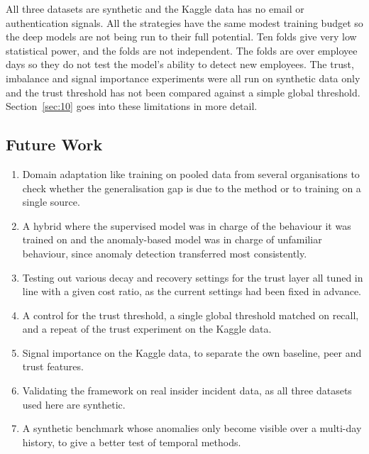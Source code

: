 \documentclass[a4paper,12pt]{article}
\begin{document}
All three datasets are synthetic and the Kaggle data has no email or authentication signals. All the strategies have the same modest training budget so the deep models are not being run to their full potential. Ten folds give very low statistical power, and the folds are not independent. The folds are over employee days so they do not test the model's ability to detect new employees. The trust, imbalance and signal importance experiments were all run on synthetic data only and the trust threshold has not been compared against a simple global threshold. Section~\ref{sec:10} goes into these limitations in more detail.

\subsection{Future Work}
\label{sec:11.3}

\begin{enumerate}
  \item Domain adaptation like training on pooled data from several organisations to check whether the generalisation gap is due to the method or to training on a single source.
  \item A hybrid where the supervised model was in charge of the behaviour it was trained on and the anomaly-based model was in charge of unfamiliar behaviour, since anomaly detection transferred most consistently.
  \item Testing out various decay and recovery settings for the trust layer all tuned in line with a given cost ratio, as the current settings had been fixed in advance.
  \item A control for the trust threshold, a single global threshold matched on recall, and a repeat of the trust experiment on the Kaggle data.
  \item Signal importance on the Kaggle data, to separate the own baseline, peer and trust features.
  \item Validating the framework on real insider incident data, as all three datasets used here are synthetic.
  \item A synthetic benchmark whose anomalies only become visible over a multi-day history, to give a better test of temporal methods.
\end{enumerate}

{\raggedright
}
\end{document}
